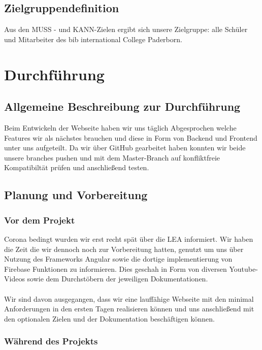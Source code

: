 \documentclass[12pt,titlepage]{article}
\begin{document}
\subsection{Zielgruppendefinition}

Aus den MUSS - und KANN-Zielen ergibt sich unsere Zielgruppe: alle Schüler und Mitarbeiter des bib international College Paderborn. 


\section{Durchführung}

\subsection{Allgemeine Beschreibung zur Durchführung}

Beim Entwickeln der Webseite  haben wir uns täglich Abgesprochen welche Features wir als nächstes brauchen und diese in Form von  Backend und Frontend unter uns aufgeteilt. Da wir über GitHub gearbeitet haben konnten wir beide unsere branches pushen und mit dem Master-Branch auf konfliktfreie Kompatibiltät prüfen und anschließend testen.

\subsection{Planung und Vorbereitung}

\subsubsection{Vor dem Projekt}

Corona bedingt wurden wir erst recht spät über die LEA informiert. Wir haben die Zeit die wir dennoch noch zur Vorbereitung hatten, genutzt um uns über Nutzung des Frameworks Angular sowie die dortige implementierung von Firebase Funktionen zu informieren. Dies geschah in Form von diversen Youtube-Videos sowie dem Durchstöbern der jeweiligen Dokumentationen.\\ \\
Wir sind davon ausgegangen, dass wir eine lauffähige Webseite mit den minimal Anforderungen in den ersten Tagen realisieren können und uns anschließend mit den optionalen Zielen und der Dokumentation beschäftigen können.

\subsubsection{Während des Projekts}
\end{document}
